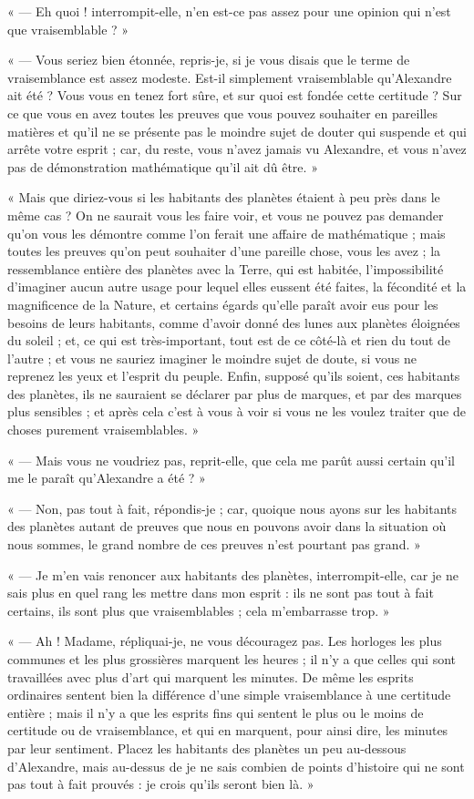 \documentclass[a4paper, 11pt, oneside]{article}
\begin{document}
« --- Eh quoi ! interrompit-elle, n'en est-ce pas assez pour une opinion qui n'est que vraisemblable ? »

« --- Vous seriez bien étonnée, repris-je, si je vous disais que le terme de vraisemblance est assez modeste. Est-il simplement vraisemblable qu'Alexandre ait été ? Vous vous en tenez fort sûre, et sur quoi est fondée cette certitude ? Sur ce que vous en avez toutes les preuves que vous pouvez souhaiter en pareilles matières et qu'il ne se présente pas le moindre sujet de douter qui suspende et qui arrête votre esprit ; car, du reste, vous n'avez jamais vu Alexandre, et vous n'avez pas de démonstration mathématique qu'il ait dû être. »

« Mais que diriez-vous si les habitants des planètes étaient à peu près dans le même cas ? On ne saurait vous les faire voir, et vous ne pouvez pas demander qu'on vous les démontre comme l'on ferait une affaire de mathématique ; mais toutes les preuves qu'on peut souhaiter d'une pareille chose, vous les avez ; la ressemblance entière des planètes avec la Terre, qui est habitée, l'impossibilité d'imaginer aucun autre usage pour lequel elles eussent été faites, la fécondité et la magnificence de la Nature, et certains égards qu'elle paraît avoir eus pour les besoins de leurs habitants, comme d'avoir donné des lunes aux planètes éloignées du soleil ; et, ce qui est très-important, tout est de ce côté-là et rien du tout de l'autre ; et vous ne sauriez imaginer le moindre sujet de doute, si vous ne reprenez les yeux et l'esprit du peuple. Enfin, supposé qu'ils soient, ces habitants des planètes, ils ne sauraient se déclarer par plus de marques, et par des marques plus sensibles ; et après cela c'est à vous à voir si vous ne les voulez traiter que de choses purement vraisemblables. »

« --- Mais vous ne voudriez pas, reprit-elle, que cela me parût aussi certain qu'il me le paraît qu'Alexandre a été ? »

« --- Non, pas tout à fait, répondis-je ; car, quoique nous ayons sur les habitants des planètes autant de preuves que nous en pouvons avoir dans la situation où nous sommes, le grand nombre de ces preuves n'est pourtant pas grand. »

« --- Je m'en vais renoncer aux habitants des planètes, interrompit-elle, car je ne sais plus en quel rang les mettre dans mon esprit : ils ne sont pas tout à fait certains, ils sont plus que vraisemblables ; cela m'embarrasse trop. »

« --- Ah ! Madame, répliquai-je, ne vous découragez pas. Les horloges les plus communes et les plus grossières marquent les heures ; il n'y a que celles qui sont travaillées avec plus d'art qui marquent les minutes. De même les esprits ordinaires sentent bien la différence d'une simple vraisemblance à une certitude entière ; mais il n'y a que les esprits fins qui sentent le plus ou le moins de certitude ou de vraisemblance, et qui en marquent, pour ainsi dire, les minutes par leur sentiment. Placez les habitants des planètes un peu au-dessous d'Alexandre, mais au-dessus de je ne sais combien de points d'histoire qui ne sont pas tout à fait prouvés : je crois qu'ils seront bien là. »
\end{document}
